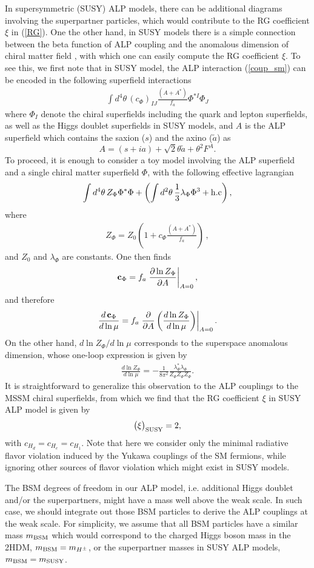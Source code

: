 \documentclass[preprint,prd,aps,tighten,nofootinbib,amssymb]{revtex4}
\newcommand{\bea}{\begin{eqnarray}}
\newcommand{\eea}{\end{eqnarray}}
\newcommand{\dis}[1]{\begin{equation}\begin{split}#1\end{split}\end{equation}}
\def\vpq{f_{a}}
\begin{document}
In supersymmetric (SUSY) ALP models, there can be additional diagrams involving the superpartner particles, which would contribute to the RG coefficient $\xi$ in (\ref{RG}).
One the other hand, in SUSY models there is a simple connection  between the beta function of ALP coupling  and the anomalous dimension of chiral matter field \cite{ArkaniHamed:1998kj}, with which one can easily compute the RG coefficient  $\xi$.
To see this, we first note that in SUSY model, the ALP interaction (\ref{coup_sm}) can be encoded in the following superfield interactions
\bea
\int d^4\theta \, (c_\Phi)_{IJ}\frac{(A+A^*)}{\vpq}\Phi^{*I}\Phi_J 
\eea
where $\Phi_I$ denote the chiral superfields including the quark and lepton superfields, as well as the Higgs doublet superfields in SUSY models, and $A$ is the ALP superfield which contains the saxion ($s$) and the axino ($\tilde a$) as
$$A= (s+ia)+\sqrt{2}\theta\tilde a + \theta^2 F^A.
$$ 
To proceed, it is enough to consider a toy  model involving the ALP superfield and a single chiral matter superfield $\Phi$, with the following effective lagrangian
\bea
\int d^4\theta \, Z_\Phi\Phi^*\Phi +\left(\int d^2\theta\,
\frac{1}{3}\lambda_\Phi \Phi^3+{\rm h.c}\right), 
\eea
where 
\bea
Z_\Phi=Z_0\left(1 +c_\Phi\frac{(A+A^*)}{\vpq}\right)\, ,
\eea
and  $Z_0$ and $\lambda_\Phi$ are constants.  
One then finds 
\dis{
\label{c_susy}
\bold c_\Phi = \vpq \left. \frac{\partial \ln Z_\Phi}{\partial A} \right|_{A=0}, 
}
and therefore 
\dis{
\label{cr_susy}
\frac{d \, \bold c_\Phi}{d \ln \mu} = \vpq \left. \frac{\partial}{\partial A} \left( \frac{d \ln Z_\Phi}{d \ln \mu} \right) \right|_{A=0}.
}
On the other hand, $d\ln Z_\Phi/d\ln\mu$ corresponds to the superspace anomalous dimension, whose one-loop expression is given by 
\bea
\frac{d \ln Z_\Phi}{d \ln \mu} =-\frac{1}{8\pi^2}\frac{\lambda_\Phi^*\lambda_\Phi}{Z_\Phi Z_\Phi Z_\Phi}.
\eea
It is straightforward to generalize this observation to the ALP couplings to the MSSM chiral superfields,  from which we find that the RG coefficient $\xi$ in SUSY ALP model is given by
\bea
\big(\xi\big)_{\rm SUSY}=2,
\eea
with $c_{H_d} = c_{H_e} = c_{H_1}$.
Note that here we consider only the minimal radiative flavor violation induced by the Yukawa couplings of the SM fermions, while ignoring other sources of flavor violation which might exist in SUSY models.

The BSM degrees of freedom in our ALP model, i.e. additional Higgs doublet and/or the superpartners, might have a mass well above the weak scale. In such case, we should integrate out those BSM particles to derive the ALP couplings at the weak scale.  
For simplicity, we assume that all BSM particles have a similar mass $m_{\rm BSM}$ which would correspond to the charged Higgs boson mass in the 2HDM, $m_{\rm BSM}=m_{H^\pm}$, or the superpartner masses in SUSY ALP models,  $m_{\rm BSM}=m_{\rm SUSY}$.
\end{document}
